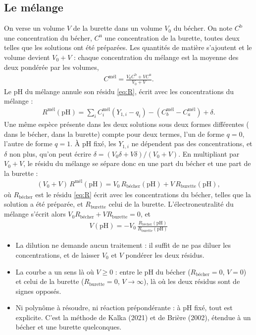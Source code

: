 \documentclass[a4paper,11pt]{article}
\newcommand\rmxphys[1]{\begin{tcolorbox}[rmq, bleu, left=3pt]\begin{itemize}[label=\faLightbulb, leftmargin=*, topsep=0pt, itemsep=2pt]#1\end{itemize}\end{tcolorbox}}
\newcommand\rsltm[1]{\boxed{#1}}
\newcommand\pH{\ensuremath{\mathrm{pH}}\xspace}
\newcommand\pare[1]{\left(#1\right)}
\newcommand\Rb{R_\text{bécher}}
\newcommand\Ru{R_\text{burette}}
\begin{document}
\subsection{Le mélange}
On verse un volume $V$ de la burette dans un volume $V_0$ du bécher.
On note $C^\text{b}$ une concentration du bécher, $C^\text{u}$ une concentration de la burette, toutes deux telles que les solutions ont été préparées.
Les quantités de matière s'ajoutent et le volume devient $V_0+V$ : chaque concentration du mélange est la moyenne des deux pondérée par les volumes,
\begin{align}
C^\text{mél}=\frac{V_0C^\text{b}+VC^\text{u}}{V_0+V}.
\end{align}
Le \pH du mélange annule son résidu \eqref{eq:R}, écrit avec les concentrations du mélange :
\begin{align}
R^\text{mél}(\pH)=\sum_iC_i^\text{mél}\pare{Y_{1,i}-q_i}-\pare{C_b^\text{mél}-C_a^\text{mél}}+\delta.
\end{align}
Une même espèce présente dans les deux solutions sous deux formes différentes ( dans le bécher,  dans la burette) compte pour deux termes, l'un de forme $q=0$, l'autre de forme $q=1$.
À \pH fixé, les $Y_{1,i}$ ne dépendent pas des concentrations, et $\delta$ non plus, qu'on peut écrire $\delta=\pare{V_0\delta+V\delta}/(V_0+V)$.
En multipliant par $V_0+V$, le résidu du mélange se sépare donc en une part du bécher et une part de la burette :
\begin{align}
(V_0+V)\,R^\text{mél}(\pH)=V_0\,\Rb(\pH)+V\,\Ru(\pH),
\end{align}
où $\Rb$ est le résidu \eqref{eq:R} écrit avec les concentrations du bécher, telles que la solution a été préparée, et $\Ru$ celui de la burette.
L'électroneutralité du mélange s'écrit alors $V_0\Rb+V\Ru=0$, et
\begin{align}
\rsltm{V(\pH)=-V_0\,\frac{\Rb(\pH)}{\Ru(\pH)}}
\label{eq:V}
\end{align}
\rmxphys{
\item La dilution ne demande aucun traitement : il suffit de ne pas diluer les concentrations, et de laisser $V_0$ et $V$ pondérer les deux résidus.
\item La courbe a un sens là où $V\ge0$ : entre le \pH du bécher ($\Rb=0$, $V=0$) et celui de la burette ($\Ru=0$, $V\to\infty$), là où les deux résidus sont de signes opposés.
\item Ni polynôme à résoudre, ni réaction prépondérante : à \pH fixé, tout est explicite.
C'est la méthode de Kalka (2021) et de Brière (2002), étendue à un bécher et une burette quelconques.
}
\end{document}
